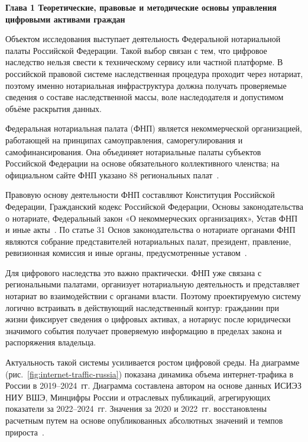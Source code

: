 \newpage
\begin{center}
  \textbf{\large Глава 1 Теоретические, правовые и методические основы управления цифровыми активами граждан}
\end{center}
\setcounter{section}{0}


Объектом исследования выступает деятельность Федеральной нотариальной палаты Российской Федерации. Такой выбор связан с тем, что цифровое наследство нельзя свести к техническому сервису или частной платформе. В российской правовой системе наследственная процедура проходит через нотариат, поэтому именно нотариальная инфраструктура должна получать проверяемые сведения о составе наследственной массы, воле наследодателя и допустимом объёме раскрытия данных.

Федеральная нотариальная палата (ФНП) является некоммерческой организацией, работающей на принципах самоуправления, саморегулирования и самофинансирования. Она объединяет нотариальные палаты субъектов Российской Федерации на основе обязательного коллективного членства; на официальном сайте ФНП указано 88 региональных палат~\cite{fnpOfficialAbout}.

Правовую основу деятельности ФНП составляют Конституция Российской Федерации, Гражданский кодекс Российской Федерации, Основы законодательства о нотариате, Федеральный закон «О некоммерческих организациях», Устав ФНП и иные акты~\cite{fnpOfficialAbout}. По статье 31 Основ законодательства о нотариате органами ФНП являются собрание представителей нотариальных палат, президент, правление, ревизионная комиссия и иные органы, предусмотренные уставом~\cite{notariatLawArticle31}.

Для цифрового наследства это важно практически. ФНП уже связана с региональными палатами, организует нотариальную деятельность и представляет нотариат во взаимодействии с органами власти. Поэтому проектируемую систему логично встраивать в действующий наследственный контур: гражданин при жизни фиксирует сведения о цифровых активах, а нотариус после юридически значимого события получает проверяемую информацию в пределах закона и распоряжения владельца.

Актуальность такой системы усиливается ростом цифровой среды. На диаграмме (рис.~\ref{fig:internet-traffic-russia}) показана динамика объема интернет-трафика в России в 2019--2024~гг. Диаграмма составлена автором на основе данных ИСИЭЗ НИУ ВШЭ, Минцифры России и отраслевых публикаций, агрегирующих показатели за 2022--2024~гг. Значения за 2020 и 2022~гг. восстановлены расчетным путем на основе опубликованных абсолютных значений и темпов прироста~\cite{HSEInternetInfrastructurePandemic2021,HSETelecomInfrastructure2022,TAdviserInternetTrafficRussia2026}.

